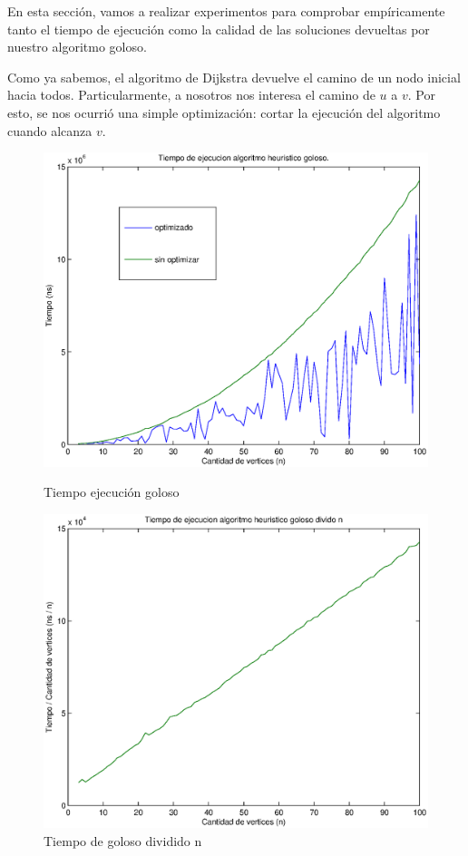 En esta sección, vamos a realizar experimentos para comprobar empíricamente tanto el tiempo de ejecución como la calidad de las soluciones devueltas por nuestro algoritmo goloso.

Como ya sabemos, el algoritmo de Dijkstra devuelve el camino de un nodo inicial hacia todos. Particularmente, a nosotros nos interesa el camino de $u$ a $v$. Por esto, se nos ocurrió una simple optimización: cortar la ejecución del algoritmo cuando alcanza $v$.

\begin{figure}[H]
  \begin{minipage}{0.5\linewidth}
    \includegraphics[width=\linewidth]{graficos/goloso_tiempo.eps}
    \caption{Tiempo ejecución goloso}\label{fig:goloso-tiempo}
  \end{minipage}
  \hfill
  \begin{minipage}{0.5\linewidth}
    \includegraphics[width=\linewidth]{graficos/goloso_tiempo_div_n.eps}
    \caption{Tiempo de goloso dividido n}\label{fig:goloso-tiempo-n}
  \end{minipage}
\end{figure}

